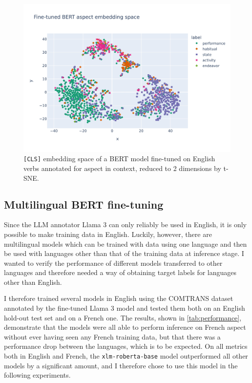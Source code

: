 \begin{figure}
    \includegraphics[width=\textwidth]{img/aspect_latent_space.jpeg}
    \caption[BERT aspect latent space]{\texttt{[CLS]} embedding space of a BERT model fine-tuned on English verbs annotated for aspect in context, reduced to 2 dimensions by t-SNE.}
    \label{fig:fine-tuned_aspect_latent_space}
\end{figure}

\subsection{Multilingual BERT fine-tuning}
Since the LLM annotator Llama 3 can only reliably be used in English, it is only possible to make training data in English. Luckily, however, there are multilingual models which can be trained with data using one language and then be used with languages other than that of the training data at inference stage. I wanted to verify the performance of different models transferred to other languages and therefore needed a way of obtaining target labels for languages other than English.

I therefore trained several models in English using the COMTRANS dataset annotated by the fine-tuned Llama 3 model and tested them both on an English hold-out test set and on a French one. The results, shown in \ref{tab:performance}, demonstrate that the models were all able to perform inference on French aspect without ever having seen any French training data, but that there was a performance drop between the languages, which is to be expected. On all metrics both in English and French, the \texttt{xlm-roberta-base} model outperformed all other models by a significant amount, and I therefore chose to use this model in the following experiments. 

